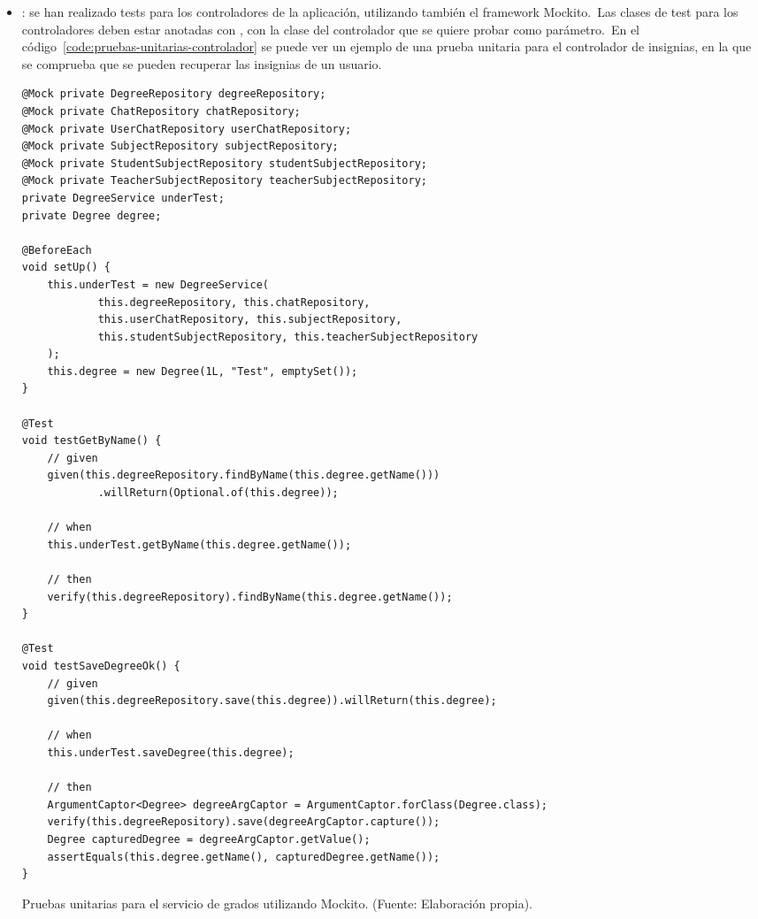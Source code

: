 \begin{itemize}
	\item {}: se han realizado tests para los controladores de la aplicación, utilizando también
	el framework Mockito.\ Las clases de test para los controladores deben estar anotadas con ,
	con la clase del controlador que se quiere probar como parámetro.\ En el
	código~\ref{code:pruebas-unitarias-controlador} se puede ver un ejemplo
	de una prueba unitaria para el controlador de insignias, en la que se comprueba que se pueden recuperar las
	insignias de un usuario.

	\begin{codeBlock}
		\begin{verbatim}
@Mock private DegreeRepository degreeRepository;
@Mock private ChatRepository chatRepository;
@Mock private UserChatRepository userChatRepository;
@Mock private SubjectRepository subjectRepository;
@Mock private StudentSubjectRepository studentSubjectRepository;
@Mock private TeacherSubjectRepository teacherSubjectRepository;
private DegreeService underTest;
private Degree degree;

@BeforeEach
void setUp() {
	this.underTest = new DegreeService(
			this.degreeRepository, this.chatRepository,
			this.userChatRepository, this.subjectRepository,
			this.studentSubjectRepository, this.teacherSubjectRepository
	);
	this.degree = new Degree(1L, "Test", emptySet());
}

@Test
void testGetByName() {
	// given
	given(this.degreeRepository.findByName(this.degree.getName()))
			.willReturn(Optional.of(this.degree));

	// when
	this.underTest.getByName(this.degree.getName());

	// then
	verify(this.degreeRepository).findByName(this.degree.getName());
}

@Test
void testSaveDegreeOk() {
	// given
	given(this.degreeRepository.save(this.degree)).willReturn(this.degree);

	// when
	this.underTest.saveDegree(this.degree);

	// then
	ArgumentCaptor<Degree> degreeArgCaptor = ArgumentCaptor.forClass(Degree.class);
	verify(this.degreeRepository).save(degreeArgCaptor.capture());
	Degree capturedDegree = degreeArgCaptor.getValue();
	assertEquals(this.degree.getName(), capturedDegree.getName());
}
		\end{verbatim}
		\caption{Pruebas unitarias para el servicio de grados utilizando Mockito. (Fuente: Elaboración propia).}
		\label{code:degreeServiceTest}
	\end{codeBlock}


\end{itemize}
